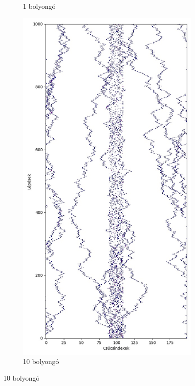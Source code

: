 \begin{figure}[H]
\begin{subfigure}{.4\linewidth}
    \caption{1 bolyongó}
  \end{subfigure}
  \begin{subfigure}{.4\linewidth}
    \centering
    \includegraphics[width=\linewidth]{./figures/sulyzo/sim01.jpg}
    \caption{10 bolyongó}
  \end{subfigure}
\end{figure}

